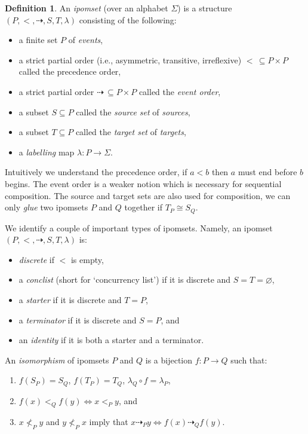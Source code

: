 \documentclass[12pt]{article}
\theoremstyle{definition}
\newtheorem{definition}[theorem]{Definition}
\newcommand{\1}{\mathbbm{1}}
\begin{document}
\begin{definition}{\cite{ipomsets2024}}
    An \emph{ipomset} (over an alphabet $\Sigma$) is a structure $(P, <, \dashrightarrow, S, T, \lambda)$ consisting of the following:
    \begin{itemize}
        \item a finite set $P$ of \emph{events},
        \item a strict partial order (i.e., asymmetric, transitive, irreflexive) $<\, \subseteq P\times P$ called the precedence order,
        \item a strict partial order $\dashrightarrow\,\subseteq P\times P$ called the \emph{event order},
        \item a subset $S\subseteq P$ called the \emph{source set} of \emph{sources},
        \item a subset $T\subseteq P$ called the \emph{target set} of \emph{targets},
        \item a \emph{labelling} map $\lambda: P\to \Sigma$.
    \end{itemize}
\end{definition}

Intuitively we understand the precedence order, if $a<b$ then $a$ must end before $b$ begins. The event order is a weaker notion which is necessary for sequential composition. The source and target sets are also used for composition, we can only \emph{glue} two ipomsets $P$ and $Q$ together if $T_P \cong S_Q$.

We identify a couple of important types of ipomsets. Namely, an ipomset $(P,<,\dashrightarrow, S, T, \lambda)$ is:

\begin{itemize}
    \item \emph{discrete} if $<$ is empty,
    \item a \emph{conclist} (short for `concurrency list') if it is discrete and $S=T=\varnothing$,
    \item a \emph{starter} if it is discrete and $T = P$,
    \item a \emph{terminator} if it is discrete and $S = P$, and
    \item an \emph{identity} if it is both a starter and a terminator.
\end{itemize}

An \emph{isomorphism} of ipomsets $P$ and $Q$ is a bijection $f: P\to Q$ such that:
\begin{enumerate}
    \item $f(S_P) = S_Q$, $f(T_P) = T_Q$, $\lambda_Q\circ f = \lambda_P$,
    \item $f(x) <_Q f(y) \iff x <_P y$, and
    \item $x \nless_P y$ and $y\nless_P x$ imply that $x\dashrightarrow_P y \iff f(x)\dashrightarrow_Q f(y)$.
\end{enumerate}
\end{document}

